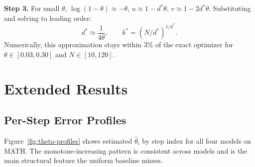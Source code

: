 \documentclass[11pt]{article}
\theoremstyle{plain}
\theoremstyle{definition}
\begin{document}
\textbf{Step 3.} For small $\theta$, $\log(1-\theta)\approx -\theta$,
$u\approx 1-d^*\theta$, $v\approx 1-2d^*\theta$. Substituting and solving
to leading order:
\[
  d^* \approx \frac{1}{4\theta},
  \qquad k^* = (N/d^*)^{1/d^*}.
\]
Numerically, this approximation stays within $3\%$ of the exact optimizer
for $\theta \in [0.03, 0.30]$ and $N \in [10, 120]$.

\section{Extended Results}
\label{app:extended}

\subsection{Per-Step Error Profiles}

Figure~\ref{fig:theta-profiles} shows estimated $\hat\theta_i$ by step index
for all four models on MATH. The monotone-increasing pattern is consistent
across models and is the main structural feature the uniform baseline misses.
\end{document}
